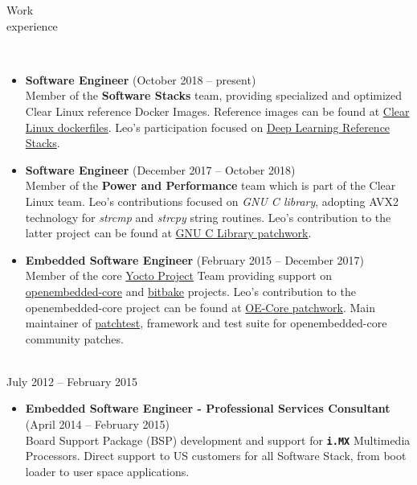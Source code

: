 \documentclass{resume}
\begin{document}
\begin{category}{Work \\experience}

\\

\begin{itemize}
\item \textbf{Software Engineer} (October 2018 -- present)\\
  Member of the \textbf{Software Stacks} team, providing specialized and optimized
  Clear Linux reference Docker Images. Reference images can be found at
  \href{https://github.com/clearlinux/dockerfiles}{Clear Linux
    dockerfiles}. Leo's participation focused on
  \href{https://github.com/clearlinux/dockerfiles/tree/master/stacks/dlrs}{Deep 
   Learning Reference Stacks}.
\end{itemize}


\begin{itemize}
\item \textbf{Software Engineer} (December 2017 -- October 2018)\\
  Member of the \textbf{Power and Performance} team which is part of the Clear
  Linux team. Leo's contributions focused on \textit{GNU
    C library}, adopting AVX2 technology for \textit{strcmp} and
  \textit{strcpy} string routines. Leo's contribution to the latter project can be found at
  \href{https://patchwork.ozlabs.org/project/glibc/list/?submitter=74072}{GNU
    C Library patchwork}.
\end{itemize}

\begin{itemize}
\item \textbf{Embedded Software Engineer} (February 2015 -- December 2017)\\
  Member of the core \href{https://www.yoctoproject.org/}{Yocto Project} Team
  providing support on \href{http://cgit.openembedded.org/openembedded-core/}{openembedded-core}
  and \href{http://cgit.openembedded.org/bitbake/}{bitbake} projects. Leo's contribution to 
  the openembedded-core project can be found at
  \href{https://patchwork.openembedded.org/project/oe-core/series/?ordering=-last_updated}{OE-Core patchwork}. Main maintainer of
  \href{http://git.yoctoproject.org/cgit/cgit.cgi/patchtest/}{patchtest}, framework and test suite for openembedded-core 
  community patches.
\end{itemize}

\\
July 2012 -- February 2015
\begin{itemize}
\item \textbf{Embedded Software Engineer - Professional Services Consultant} (April 2014 -- February 2015)\\
  Board Support Package (BSP) development and support for \textbf{\texttt{i.MX}}
  Multimedia Processors. Direct support to US customers for all Software
  Stack, from boot loader to user space applications.
\end{itemize}


\end{category}
\end{document}
